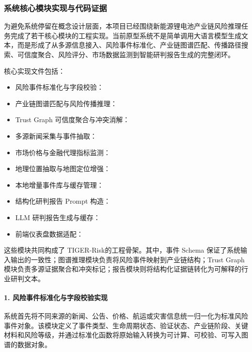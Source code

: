 \documentclass[12pt,a4paper]{article}
\newcommand{\projectshort}{TIGER-Risk}
\begin{document}
\subsubsection{系统核心模块实现与代码证据}

为避免系统停留在概念设计层面，本项目已经围绕新能源锂电池产业链风险推理任务完成了若干核心模块的工程实现。当前原型系统不是简单调用大语言模型生成文本，而是形成了从多源信息接入、风险事件标准化、产业链图谱匹配、传播路径搜索、可信度聚合、风险评分、市场数据监测到智能研判报告生成的完整闭环。

核心实现文件包括：
\begin{itemize}
    \item 风险事件标准化与字段校验：
    \item 产业链图谱匹配与风险传播推理：
    \item Trust Graph 可信度聚合与冲突消解：
    \item 多源新闻采集与事件抽取：
    \item 市场价格与金融代理指标监测：
    \item 地理位置抽取与地图定位增强：
    \item 本地增量事件库与缓存管理：
    \item 结构化研判报告 Prompt 构造：
    \item LLM 研判报告生成与缓存：
    \item 前端仪表盘数据适配：
\end{itemize}

这些模块共同构成了 \projectshort 的工程骨架。其中，事件 Schema 保证了系统输入输出的一致性；图谱推理模块负责将风险事件映射到产业链结构；Trust Graph 模块负责多源证据聚合和冲突标记；报告模块则将结构化证据链转化为可解释的行业研判文本。

\paragraph{1. 风险事件标准化与字段校验实现}

系统首先将不同来源的新闻、公告、价格、航运或灾害信息统一归一化为标准风险事件对象。该模块定义了事件类型、生命周期状态、验证状态、产业链阶段、关键材料和风险等级，并通过标准化函数将原始输入转换为可计算、可校验、可写入图谱的数据对象。
\end{document}
